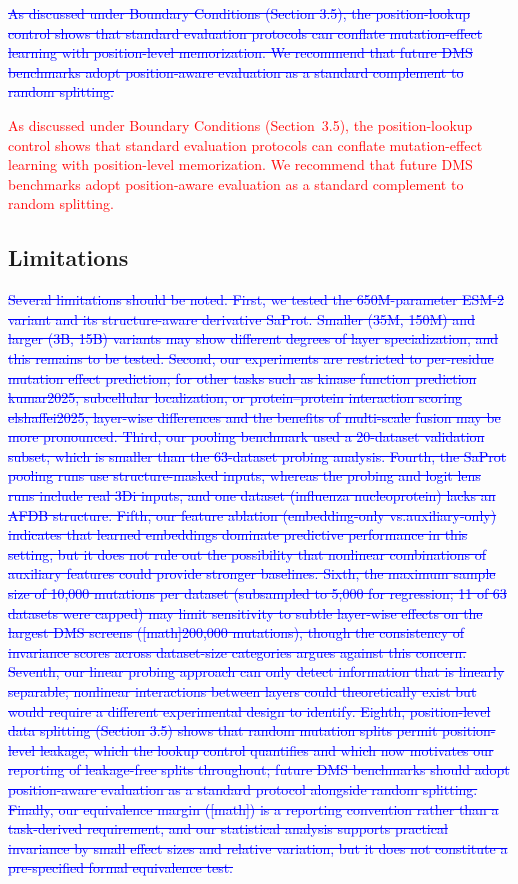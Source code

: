 \documentclass[11pt,a4paper]{article}
\newcommand{\rev}[1]{\textcolor{red}{#1}}
\begin{document}
\textcolor{blue}{\sout{As discussed under Boundary Conditions (Section 3.5), the position-lookup
control shows that standard evaluation protocols can conflate mutation-effect learning with
position-level memorization. We recommend that future DMS benchmarks adopt
position-aware evaluation as a standard complement to random splitting.}}

\textcolor{red}{As discussed under Boundary Conditions (Section~3.5), \rev{the position-lookup
control shows that} standard evaluation protocols can conflate mutation-effect learning with
position-level memorization. We recommend that future DMS benchmarks adopt
position-aware evaluation as a standard complement to random splitting.}

\subsection{Limitations}

\textcolor{blue}{\sout{Several limitations should be noted. First, we tested the 650M-parameter
ESM-2 variant and its structure-aware derivative SaProt. Smaller (35M, 150M)
and larger (3B, 15B) variants may show different degrees of layer specialization,
and this remains to be tested. Second, our
experiments are restricted to per-residue mutation effect prediction; for other
tasks such as kinase function prediction kumar2025, subcellular
localization, or protein--protein interaction scoring elshaffei2025,
layer-wise differences and the benefits of multi-scale fusion may be more
pronounced. Third, our pooling benchmark used a 20-dataset validation subset,
which is smaller than the 63-dataset probing analysis. Fourth,
the SaProt pooling runs use structure-masked inputs, whereas the probing and logit
lens runs include real 3Di inputs, and one dataset (influenza nucleoprotein) lacks
an AFDB structure. Fifth, our
feature ablation (embedding-only vs.auxiliary-only) indicates that learned embeddings
dominate predictive performance in this setting, but it does
not rule out the possibility that nonlinear combinations of auxiliary features
could provide stronger baselines.
Sixth, the
maximum sample size of 10,000 mutations per dataset (subsampled to 5,000 for
regression; 11 of 63 datasets were capped) may limit sensitivity to
subtle layer-wise effects on the largest DMS screens ([math]200,000 mutations),
though the consistency of invariance scores across dataset-size categories argues
against this concern. Seventh, our linear probing approach can only detect
information that is linearly separable; nonlinear interactions between layers
could theoretically exist but would require a different experimental design to
identify. Eighth, position-level data splitting (Section 3.5) shows that
random mutation splits permit position-level leakage, which the lookup
control quantifies and which now motivates our reporting of leakage-free splits
throughout; future DMS benchmarks should adopt position-aware evaluation as a
standard protocol alongside random splitting. Finally, our equivalence margin
([math]) is a reporting convention rather than a
task-derived requirement, and our
statistical analysis supports practical invariance by small effect sizes and
relative variation, but it does not constitute a pre-specified formal equivalence
test.}}
\end{document}
